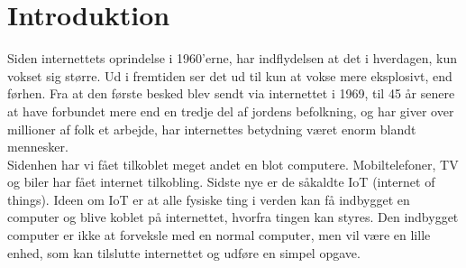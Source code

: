 \newpage
\section{Introduktion}
    Siden internettets oprindelse i 1960’erne, har indflydelsen at det i hverdagen, kun vokset sig større. Ud i fremtiden ser det ud til kun at vokse mere eksplosivt, end førhen. Fra at den første besked blev sendt via internettet i 1969, til 45 år senere at have forbundet mere end en tredje del af jordens befolkning, og har giver over millioner af folk et arbejde, har internettes betydning været enorm blandt mennesker.\\
    Sidenhen har vi fået tilkoblet meget andet en blot computere. Mobiltelefoner, TV og biler har fået internet tilkobling. Sidste nye er de såkaldte IoT (internet of things). Ideen om IoT er at alle fysiske ting i verden kan få indbygget en computer og blive koblet på internettet, hvorfra tingen kan styres. Den indbygget computer er ikke at forveksle med en normal computer, men vil være en lille enhed, som kan tilslutte internettet og udføre en simpel opgave.


\newpage